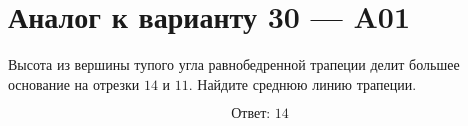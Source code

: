 


\section*{Аналог к варианту 30 — A01}
Высота из вершины тупого угла равнобедренной трапеции делит большее основание на отрезки \(14\) и \(11\). Найдите среднюю линию трапеции.
\begin{center}\figIsoscelesTrapezoid\end{center}
\[\boxed{\text{Ответ: }14}\]

